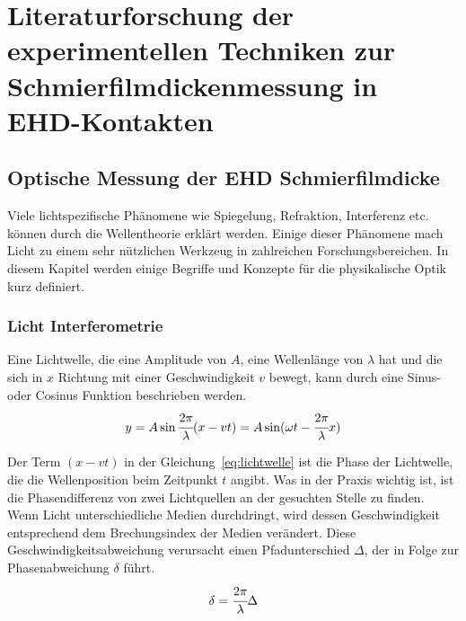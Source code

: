 \chapter{Literaturforschung der experimentellen Techniken zur Schmierfilmdickenmessung in EHD-Kontakten}
\label{chap:literaturforschung_der_experimentellen_technik_in_ehd_schmierung}

\section{Optische Messung der EHD Schmierfilmdicke}
\label{sec:optische_messung_der_ehd_schmierfilmdicke}

Viele lichtspezifische Phänomene wie Spiegelung, Refraktion, Interferenz etc. können durch die Wellentheorie erklärt werden.
Einige dieser Phänomene mach Licht zu einem sehr nützlichen Werkzeug in zahlreichen Forschungsbereichen.
In diesem Kapitel werden einige Begriffe und Konzepte für die physikalische Optik kurz definiert.

\subsection{Licht Interferometrie}
\label{ssec:licht_interferometrie}

Eine Lichtwelle, die eine Amplitude von $A$, eine Wellenlänge von $\lambda$ hat und die sich in $x$ Richtung mit einer Geschwindigkeit $v$ bewegt, kann durch eine Sinus- oder Cosinus Funktion beschrieben werden.
\begin{equation}
        y = A \sin \cfrac{2 \pi}{\lambda} (x - v t) = A \sin (\omega t - \cfrac{2 \pi}{\lambda} x)
    \label{eq:lichtwelle}
\end{equation}
%

Der Term $(x - v t)$ in der Gleichung~\ref{eq:lichtwelle} ist die Phase der Lichtwelle, die die Wellenposition beim Zeitpunkt $t$ angibt.
Was in der Praxis wichtig ist, ist die Phasendifferenz von zwei Lichtquellen an der gesuchten Stelle zu finden.
Wenn Licht unterschiedliche Medien durchdringt, wird dessen Geschwindigkeit entsprechend dem Brechungsindex der Medien verändert.
Diese Geschwindigkeitsabweichung verursacht einen Pfadunterschied $\Delta$, der in Folge zur Phasenabweichung $\delta$ führt.
\begin{equation}
    \delta = \cfrac{2 \pi}{\lambda} \Delta
    \label{eq:licht_phasenabweichung}
\end{equation}
%

